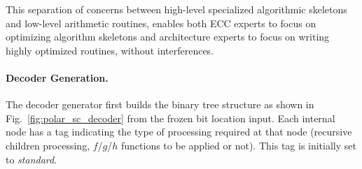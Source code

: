 This separation of concerns between high-level specialized algorithmic skeletons
and low-level arithmetic routines, enables both ECC experts to focus on
optimizing algorithm skeletons and architecture experts to focus on writing
highly optimized routines, without interferences.

\paragraph{Decoder Generation.}

The decoder generator first builds the binary tree structure as shown in
Fig.~\ref{fig:polar_sc_decoder} from the frozen bit location input. Each
internal node has a tag indicating the type of processing required at that node
(recursive children processing, $f$/$g$/$h$ functions to be applied or not).
This tag is initially set to \emph{standard}.

